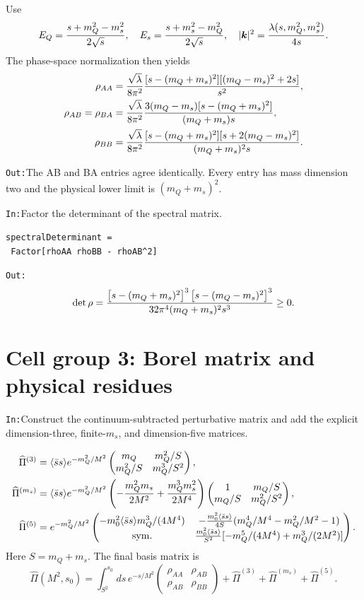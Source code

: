 \documentclass[10pt,a4paper]{article}
\newcommand{\InputCell}[1]{%
  \par\medskip\noindent\colorbox{cellblue}{%
  \parbox{\dimexpr\linewidth-2\fboxsep}{\texttt{In:}\quad #1}}\par\smallskip}
\newcommand{\OutputCell}[1]{%
  \par\smallskip\noindent\colorbox{outputgray}{%
  \parbox{\dimexpr\linewidth-2\fboxsep}{\texttt{Out:}\quad #1}}\par\medskip}
\begin{document}
Use
\begin{equation}
E_Q={s+m_Q^2-m_s^2\over2\sqrt s},\quad
E_s={s+m_s^2-m_Q^2\over2\sqrt s},\quad
|\bm k|^2={\lambda(s,m_Q^2,m_s^2)\over4s}.
\end{equation}
The phase-space normalization then yields
\begin{align}
\rho_{AA}&={\sqrt\lambda\over8\pi^2}
{[s-(m_Q+m_s)^2][(m_Q-m_s)^2+2s]\over s^2},\\
\rho_{AB}=\rho_{BA}&={\sqrt\lambda\over8\pi^2}
{3(m_Q-m_s)[s-(m_Q+m_s)^2]\over(m_Q+m_s)s},\\
\rho_{BB}&={\sqrt\lambda\over8\pi^2}
{[s-(m_Q+m_s)^2][s+2(m_Q-m_s)^2]\over(m_Q+m_s)^2s}.
\end{align}
\OutputCell{The AB and BA entries agree identically.  Every entry has mass
dimension two and the physical lower limit is $(m_Q+m_s)^2$.}

\InputCell{Factor the determinant of the spectral matrix.}
\begin{lstlisting}
spectralDeterminant =
 Factor[rhoAA rhoBB - rhoAB^2]
\end{lstlisting}
\OutputCell{\[
\det\rho={\left[s-(m_Q+m_s)^2\right]^3
\left[s-(m_Q-m_s)^2\right]^3
\over32\pi^4(m_Q+m_s)^2s^3}\ge0 .
\]}

\section{Cell group 3: Borel matrix and physical residues}

\InputCell{Construct the continuum-subtracted perturbative matrix and add
the explicit dimension-three, finite-$m_s$, and dimension-five matrices.}
\begin{align}
\widehat\Pi^{(3)}&=\langle\bar ss\rangle e^{-m_Q^2/M^2}
\begin{pmatrix}
m_Q&m_Q^2/S\\m_Q^2/S&m_Q^3/S^2
\end{pmatrix},\\
\widehat\Pi^{(m_s)}&=\langle\bar ss\rangle e^{-m_Q^2/M^2}
\left(-{m_Q^2m_s\over2M^2}+{m_Q^3m_s^2\over2M^4}\right)
\begin{pmatrix}1&m_Q/S\\m_Q/S&m_Q^2/S^2\end{pmatrix},\\
\widehat\Pi^{(5)}&=e^{-m_Q^2/M^2}
\begin{pmatrix}
-m_0^2\langle\bar ss\rangle m_Q^3/(4M^4)&
-{m_0^2\langle\bar ss\rangle\over4S}
(m_Q^4/M^4-m_Q^2/M^2-1)\\
\mathrm{sym.}&
{m_0^2\langle\bar ss\rangle\over S^2}
[-m_Q^5/(4M^4)+m_Q^3/(2M^2)]
\end{pmatrix}.
\end{align}
Here $S=m_Q+m_s$.  The final basis matrix is
\begin{equation}
\widehat\Pi(M^2,s_0)=
\int_{S^2}^{s_0}ds\,e^{-s/M^2}
\begin{pmatrix}\rho_{AA}&\rho_{AB}\\\rho_{AB}&\rho_{BB}\end{pmatrix}
+\widehat\Pi^{(3)}+\widehat\Pi^{(m_s)}+\widehat\Pi^{(5)}.
\end{equation}
\end{document}
